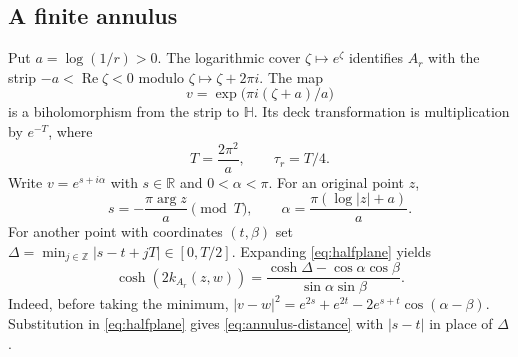 \documentclass[12pt]{amsart}
\theoremstyle{definition}
\theoremstyle{remark}
\numberwithin{equation}{section}
\newcommand{\R}{\mathbb{R}}
\newcommand{\Z}{\mathbb{Z}}
\begin{document}
\subsection{A finite annulus}
Put $a=\log(1/r)>0$. The logarithmic cover $\zeta\mapsto e^\zeta$ identifies $A_r$ with the strip $-a<\operatorname{Re}\zeta<0$ modulo $\zeta\mapsto\zeta+2\pi i$. The map
\[
 v=\exp\bigl(\pi i(\zeta+a)/a\bigr)
\]
is a biholomorphism from the strip to $\mathbb H$. Its deck transformation is multiplication by $e^{-T}$, where
\begin{equation}\label{eq:T}
 T=\frac{2\pi^2}{a},\qquad \tau_r=T/4.
\end{equation}
Write $v=e^{s+i\alpha}$ with $s\in\R$ and $0<\alpha<\pi$. For an original point $z$,
\[
 s=-\frac{\pi\arg z}{a}\pmod T,\qquad
 \alpha=\frac{\pi(\log|z|+a)}{a}.
\]
For another point with coordinates $(t,\beta)$ set $\Delta=\min_{j\in\Z}|s-t+jT|\in[0,T/2]$. Expanding \eqref{eq:halfplane} yields
\begin{equation}\label{eq:annulus-distance}
 \cosh(2k_{A_r}(z,w))=
 \frac{\cosh\Delta-\cos\alpha\cos\beta}{\sin\alpha\sin\beta}.
\end{equation}
Indeed, before taking the minimum, $|v-w|^2=e^{2s}+e^{2t}-2e^{s+t}\cos(\alpha-\beta)$. Substitution in \eqref{eq:halfplane} gives \eqref{eq:annulus-distance} with $|s-t|$ in place of $\Delta$.
\end{document}
